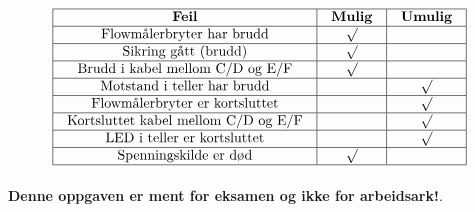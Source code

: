 $$\vbox{\offinterlineskip
\halign{\strut
\vrule \quad\hfil # \ \hfil & 
\vrule \quad\hfil # \ \hfil & 
\vrule \quad\hfil # \ \hfil \vrule \cr
\noalign{\hrule}
%
{\bf Feil} & {\bf Mulig} & {\bf Umulig} \cr
%
\noalign{\hrule}
%
Flowmålerbryter har brudd & $\surd$ &  \cr
%
\noalign{\hrule}
%
Sikring gått (brudd) & $\surd$ &  \cr
%
\noalign{\hrule}
%
Brudd i kabel mellom C/D og E/F & $\surd$ &  \cr
%
\noalign{\hrule}
%
Motstand i teller har brudd &  & $\surd$ \cr
%
\noalign{\hrule}
%
Flowmålerbryter er kortsluttet &  & $\surd$ \cr
%
\noalign{\hrule}
%
Kortsluttet kabel mellom C/D og E/F &  & $\surd$ \cr
%
\noalign{\hrule}
%
LED i teller er kortsluttet &  & $\surd$ \cr
%
\noalign{\hrule}
%
Spenningskilde er død & $\surd$ &  \cr
%
\noalign{\hrule}
} %
}$$ %








{\bf Denne oppgaven er ment for eksamen og ikke for arbeidsark!}.

